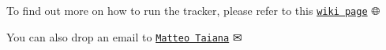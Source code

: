 To find out more on how to run the tracker, please refer to this \href{http://mediawiki.isr.ist.utl.pt/wiki/3D_ball_tracker}{\tt wiki page} 🌐

You can also drop an email to \href{mailto:mtaiana@isr.ist.utl.pt}{\tt Matteo Taiana} ✉ 